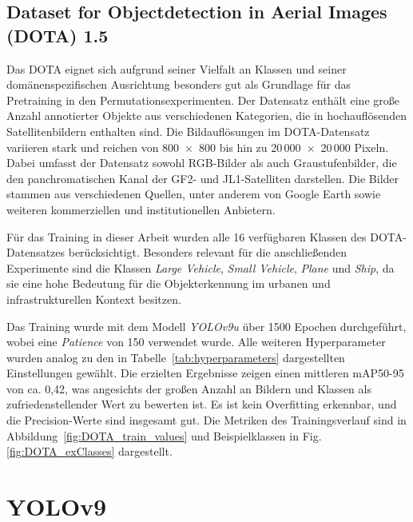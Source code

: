 \subsection{Dataset for Objectdetection in Aerial Images (DOTA) 1.5}
\label{subsec:DOTA}
Das \Acrfull{DOTA} eignet sich aufgrund seiner Vielfalt an Klassen und seiner domänenspezifischen Ausrichtung besonders gut als Grundlage für das Pretraining in den Permutationsexperimenten. Der Datensatz enthält eine große Anzahl annotierter Objekte aus verschiedenen Kategorien, die in hochauflösenden Satellitenbildern enthalten sind. Die Bildauflösungen im \acrshort{DOTA}-Datensatz variieren stark und reichen von 800~$\times$~800 bis hin zu 20\,000~$\times$~20\,000 Pixeln. Dabei umfasst der Datensatz sowohl \acrshort{RGB}-Bilder als auch Graustufenbilder, die den panchromatischen Kanal der GF2- und JL1-Satelliten darstellen. Die Bilder stammen aus verschiedenen Quellen, unter anderem von Google Earth sowie weiteren kommerziellen und institutionellen Anbietern.

Für das Training in dieser Arbeit wurden alle 16 verfügbaren Klassen des DOTA-Datensatzes berücksichtigt. Besonders relevant für die anschließenden Experimente sind die Klassen \textit{Large Vehicle}, \textit{Small Vehicle}, \textit{Plane} und \textit{Ship}, da sie eine hohe Bedeutung für die Objekterkennung im urbanen und infrastrukturellen Kontext besitzen.

Das Training wurde mit dem Modell \textit{YOLOv9u} über 1500 Epochen durchgeführt, wobei eine \textit{Patience} von 150 verwendet wurde. Alle weiteren Hyperparameter wurden analog zu den in Tabelle~\ref{tab:hyperparameters} dargestellten Einstellungen gewählt. Die erzielten Ergebnisse zeigen einen mittleren \acrshort{mAP}50-95 von ca. 0,42, was angesichts der großen Anzahl an Bildern und Klassen als zufriedenstellender Wert zu bewerten ist. Es ist kein Overfitting erkennbar, und die Precision-Werte sind insgesamt gut. Die Metriken des Trainingsverlauf sind in Abbildung~\ref{fig:DOTA_train_values} und Beispielklassen in Fig. \ref{fig:DOTA_exClasses} dargestellt.





\section{YOLOv9}
\label{sec:yolov9}

